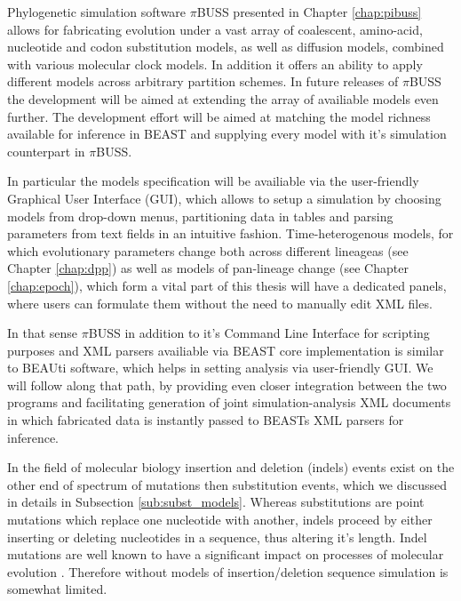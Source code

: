 Phylogenetic simulation software $\pi$BUSS presented in Chapter \ref{chap:pibuss} allows for fabricating evolution under a vast array of coalescent, amino-acid, nucleotide and codon substitution models, as well as diffusion models, combined with various molecular clock models.
In addition it offers an ability to apply different models across arbitrary partition schemes.
In future releases of $\pi$BUSS the development will be aimed at extending the array of availiable models even further.
The development effort will be aimed at matching the model richness available for inference in BEAST and supplying every model with it's simulation counterpart in $\pi$BUSS.

In particular the models specification will be availiable via the user-friendly Graphical User Interface (GUI), which allows to setup a simulation by choosing models from drop-down menus, partitioning data in tables and parsing parameters from text fields in an intuitive fashion.
Time-heterogenous models, for which evolutionary parameters change both across different lineageas (see Chapter \ref{chap:dpp}) as well as models of pan-lineage change (see Chapter \ref{chap:epoch}), which form a vital part of this thesis will have a dedicated panels, where users can formulate them without the need to manually edit XML files.

In that sense $\pi$BUSS in addition to it's Command Line Interface for scripting purposes and XML parsers availiable via BEAST core implementation is similar to BEAUti software, which helps in setting analysis via user-friendly GUI.
We will follow along that path, by providing even closer integration between the two programs and facilitating generation of joint simulation-analysis XML documents in which fabricated data is instantly passed to BEASTs XML parsers for inference.

In the field of molecular biology insertion and deletion (indels) events exist on the other end of spectrum of mutations then substitution events, which we discussed in details in Subsection \ref{sub:subst_models}.
Whereas substitutions are point mutations which replace one nucleotide with another, indels proceed by either inserting or deleting nucleotides in a sequence, thus altering it's length. 
Indel mutations are well known to have a significant impact on processes of molecular evolution \citep{Fletcher2009}.
Therefore without models of insertion/deletion sequence simulation is somewhat limited.


